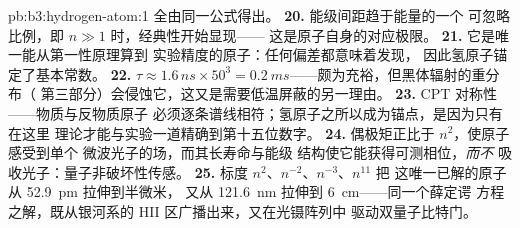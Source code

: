 \begin{solution}{pb:b3:hydrogen-atom:1}
全由同一公式得出。
\textbf{20.} 能级间距趋于能量的一个
可忽略比例，即 $n \gg 1$ 时，经典性开始显现——
这是原子自身的对应极限。
\textbf{21.} 它是唯一能从第一性原理算到
实验精度的原子：任何偏差都意味着发现，
因此氢原子锚定了基本常数。
\textbf{22.} $\tau \approx 1.6\,\unit{ns} \times 50^3 =
\qty{0.2}{ms}$——颇为充裕，但黑体辐射的重分布（
第三部分）会侵蚀它，这又是需要低温屏蔽的另一理由。
\textbf{23.} CPT 对称性——物质与反物质原子
必须逐条谱线相符；氢原子之所以成为锚点，是因为只有在这里
理论才能与实验一道精确到第十五位数字。
\textbf{24.} 偶极矩正比于 $n^2$，使原子感受到单个
微波光子的场，而其长寿命与能级
结构使它能获得可测相位，\emph{而不}
吸收光子：量子非破坏性传感。
\textbf{25.} 标度 $n^2$、$n^{-2}$、$n^{-3}$、$n^{11}$ 把
这唯一已解的原子从 \qty{52.9}{pm} 拉伸到半微米，
又从 \qty{121.6}{nm} 拉伸到 \qty{6}{cm}——同一个薛定谔
方程之解，既从银河系的 HII 区广播出来，又在光镊阵列中
驱动双量子比特门。
\end{solution}
